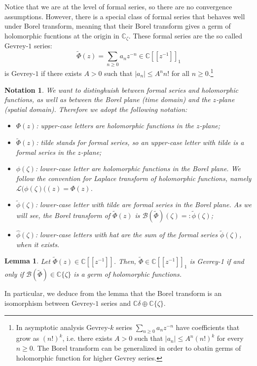\documentclass{article}
\newcommand{\C}{\mathbb{C}}
\newtheorem{lemma}[definition]{Lemma}
\newtheorem*{notation*}{Notation}
\begin{document}
Notice that we are at the level of formal series, so there are no convergence assumptions. However, there is a special class of formal series that behaves well under Borel transform, meaning that their Borel transform gives a germ of holomorphic fucntions at the origin in $\C_{\zeta}$. These formal series are the so called Gevrey-$1$ series: \[\tilde{\Phi}(z)=\sum_{n\geq 0}a_nz^{-n}\in\C[\![z^{-1}]\!]_1\] is Gevrey-$1$ if there exists $A>0$ such that $|a_n|\leq A^n n!$ for all $n\geq 0$.\footnote{In asymptotic analysis Gevrey-$k$ series $\sum_{n\geq 0}a_nz^{-n}$ have coefficients that grow as $(n!)^{k}$, i.e. there exists $A>0$ such that $|a_n|\leq A^n (n!)^k$ for every $n\geq 0$. The Borel transform can be generalized in order to obatin germs of holomorphic function for higher Gevrey series. }  

\begin{notation*}
We want to distinghuish between formal series and holomorphic functions, as well as between the Borel plane (time domain) and the $z$-plane (spatial domain). Therefore we adopt the following notation:
\begin{itemize}
\item $\Phi(z)$: upper-case letters are holomorphic functions in the $z$-plane;
\item $\tilde{\Phi}(z)$: \textit{tilde} stands for formal series, so an upper-case letter with \textit{tilde} is a formal series in the $z$-plane;
\item $\phi(\zeta)$: lower-case letter are holomorphic functions in the Borel plane. We follow the convention for Laplace transform of holomorphic functions, namely $\mathcal{L}(\phi(\zeta)((z)=\Phi(z)$. 
\item $\tilde{\phi}(\zeta)$: lower-case letter with \textit{tilde} are formal series in the Borel plane. As we will see, the Borel transform of $\tilde{\Phi}(z)$ is $\mathcal{B}(\tilde{\Phi})(\zeta)=:\tilde{\phi}(\zeta)$; 
\item $\hat{\phi}(\zeta)$: lower-case letters with \textit{hat} are the sum of the formal series $\tilde{\phi}(\zeta)$, when it exists.  
\end{itemize}
\end{notation*}  

\begin{lemma}
Let $\tilde{\Phi}(z)\in\C[\![z^{-1}]\!]$. Then, $\tilde{\Phi}\in\C[\![z^{-1}]\!]_1$ is Gevrey-1 if and only if $\mathcal{B}(\tilde{\Phi})\in\C\lbrace\zeta\rbrace$ is a germ of holomorphic functions. 
\end{lemma}
In particular, we deduce from the lemma that the Borel transform is an isomorphism between Gevrey-$1$ series and $\C\delta\oplus\C\lbrace\zeta\rbrace$. 
\end{document}
